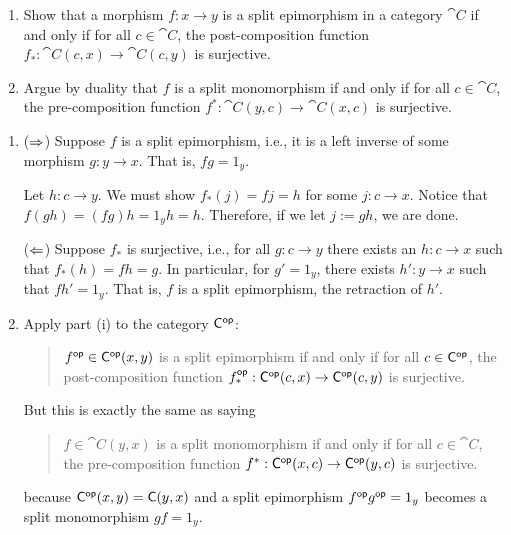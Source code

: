 \documentclass[notes,tikz]{agony}
\renewcommand{\C}{\cat{C}}
\newcommand{\inenum}{\vspace{-1.8em}}
\begin{document}
\begin{xca}
  \leavevmode
  \begin{enumerate}
    \item Show that a morphism $f : x \to y$ is a split epimorphism
          in a category $\C$ if and only if for all $c \in \C$,
          the post-composition function $f_* : \C(c,x) \to \C(c,y)$ is surjective.
    \item Argue by duality that $f$ is a split monomorphism if and only if
          for all $c \in \C$, the pre-composition function
          $f^* : \C(y,c) \to \C(x,c)$ is surjective.
  \end{enumerate}
\end{xca}
\begin{enumerate}
  \item \begin{prf}\inenum
          ($\Rightarrow$) Suppose $f$ is a split epimorphism, i.e.,
          it is a left inverse of some morphism $g : y \to x$.
          That is, $fg = 1_y$.

          Let $h : c \to y$.
          We must show $f_*(j) = fj = h$ for some $j : c \to x$.
          Notice that $f(gh) = (fg)h = 1_y h = h$.
          Therefore, if we let $j := gh$, we are done.

          ($\Leftarrow$) Suppose $f_*$ is surjective, i.e.,
          for all $g : c \to y$ there exists an $h : c \to x$
          such that $f_*(h) = fh = g$.
          In particular, for $g' = 1_y$, there exists $h' : y \to x$
          such that $fh' = 1_y$.
          That is, $f$ is a split epimorphism, the retraction of $h'$.
        \end{prf}
  \item \begin{prf}\inenum
          Apply part (i) to the category $\C\op$:
          \begin{quote}
            $f\op \in \C\op(x,y)$ is a split epimorphism
            if and only if for all $c \in \C\op$,
            the post-composition function $f_*\op : \C\op(c,x) \to \C\op(c,y)$ is surjective.
          \end{quote}
          But this is exactly the same as saying
          \begin{quote}
            $f \in \C(y,x)$ is a split monomorphism
            if and only if for all $c \in \C$,
            the pre-composition function $f^* : \C\op(x,c) \to \C\op(y,c)$ is surjective.
          \end{quote}
          because $\C\op(x,y) = \C(y,x)$
          and a split epimorphism $f^{\mathsf{op}} g^{\mathsf{op}} = 1_y$
          becomes a split monomorphism $gf = 1_y$.
        \end{prf}
\end{enumerate}
\end{document}
